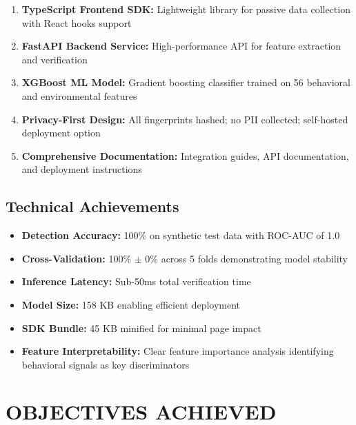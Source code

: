 \begin{enumerate}
    \item \textbf{TypeScript Frontend SDK:} Lightweight library for passive data collection with React hooks support
    
    \item \textbf{FastAPI Backend Service:} High-performance API for feature extraction and verification
    
    \item \textbf{XGBoost ML Model:} Gradient boosting classifier trained on 56 behavioral and environmental features
    
    \item \textbf{Privacy-First Design:} All fingerprints hashed; no PII collected; self-hosted deployment option
    
    \item \textbf{Comprehensive Documentation:} Integration guides, API documentation, and deployment instructions
\end{enumerate}

\subsection{Technical Achievements}

\begin{itemize}
    \item \textbf{Detection Accuracy:} 100\% on synthetic test data with ROC-AUC of 1.0
    \item \textbf{Cross-Validation:} 100\% $\pm$ 0\% across 5 folds demonstrating model stability
    \item \textbf{Inference Latency:} Sub-50ms total verification time
    \item \textbf{Model Size:} 158 KB enabling efficient deployment
    \item \textbf{SDK Bundle:} 45 KB minified for minimal page impact
    \item \textbf{Feature Interpretability:} Clear feature importance analysis identifying behavioral signals as key discriminators
\end{itemize}

\section{OBJECTIVES ACHIEVED}

